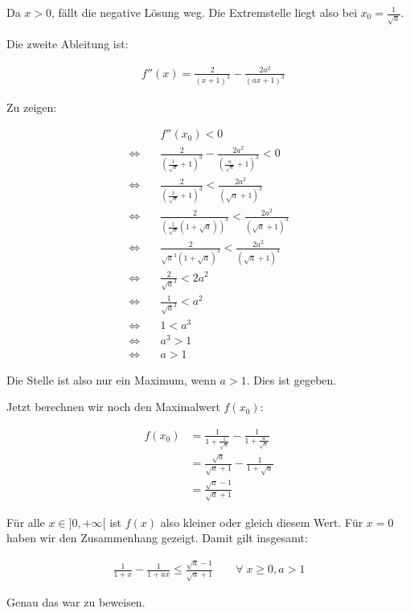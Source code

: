 \documentclass[a4paper,german,12pt,smallheadings]{scrartcl}
\begin{document}
Da $x > 0$, fällt die negative Lösung weg. Die Extremstelle liegt also bei $x_0
= \frac{1}{\sqrt{a}}$.

Die zweite Ableitung ist:

\begin{align*}
  &f''(x) = \frac{2}{(x+1)^3} - \frac{2a^2}{(ax+1)^3}
\end{align*}

Zu zeigen:

\begin{align*}
  &f''(x_0) < 0\\
  \Leftrightarrow\quad&\frac{2}{(\frac{1}{\sqrt{a}}+1)^3} - \frac{2a^2}{(\frac{a}{\sqrt{a}}+1)^3} < 0 \\
  \Leftrightarrow\quad&\frac{2}{(\frac{1}{\sqrt{a}}+1)^3} < \frac{2a^2}{(\sqrt{a}+1)^3} \\
  \Leftrightarrow\quad&\frac{2}{(\frac{1}{\sqrt{a}}(1+\sqrt{a}))^3} < \frac{2a^2}{(\sqrt{a}+1)^3} \\
  \Leftrightarrow\quad&\frac{2}{\sqrt{a}^3 (1+\sqrt{a})^3} < \frac{2a^2}{(\sqrt{a}+1)^3} \\
  \Leftrightarrow\quad&\frac{2}{\sqrt{a}^3} < 2a^2 \\
  \Leftrightarrow\quad&\frac{1}{\sqrt{a}^3} < a^2 \\
  \Leftrightarrow\quad& 1 < a^3 \\
  \Leftrightarrow\quad& a^3 > 1\\
  \Leftrightarrow\quad& a > 1
\end{align*}

Die Stelle ist also nur ein Maximum, wenn $a > 1$. Dies ist gegeben.

Jetzt berechnen wir noch den Maximalwert $f(x_0)$:

\begin{align*}
  f(x_0) &= \frac{1}{1+\frac{1}{\sqrt{a}}} - \frac{1}{1+\frac{a}{\sqrt{a}}} \\
         &= \frac{\sqrt{a}}{\sqrt{a}+1} - \frac{1}{1+\sqrt{a}} \\
         &= \frac{\sqrt{a} - 1}{\sqrt{a}+1}
\end{align*}

Für alle $x \in ]0, +\infty[$ ist $f(x)$ also kleiner oder gleich diesem Wert.
Für $x=0$ haben wir den Zusammenhang gezeigt. Damit gilt insgesamt:

\begin{align*}
  \frac{1}{1+x} - \frac{1}{1+ax} \leq \frac{\sqrt{a} - 1}{\sqrt{a}+1} \qquad \forall\; x \geq 0, a > 1
\end{align*}

Genau das war zu beweisen.
\end{document}
